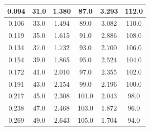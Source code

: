 \documentclass[a4paper,12pt,titlepage]{article}
\begin{document}
\begin{table}[h!]
\begin{tabular}{|cccccc}
\multicolumn{1}{|c|}{0.094}       & \multicolumn{1}{c|}{31.0}               & \multicolumn{1}{c|}{1.380}        & \multicolumn{1}{c|}{87.0}               & \multicolumn{1}{c|}{3.293}       & \multicolumn{1}{c|}{112.0}              \\ \hline
\multicolumn{1}{|c|}{0.106}       & \multicolumn{1}{c|}{33.0}               & \multicolumn{1}{c|}{1.494}       & \multicolumn{1}{c|}{89.0}               & \multicolumn{1}{c|}{3.082}       & \multicolumn{1}{c|}{110.0}              \\ \hline
\multicolumn{1}{|c|}{0.119}       & \multicolumn{1}{c|}{35.0}               & \multicolumn{1}{c|}{1.615}       & \multicolumn{1}{c|}{91.0}               & \multicolumn{1}{c|}{2.886}       & \multicolumn{1}{c|}{108.0}              \\ \hline
\multicolumn{1}{|c|}{0.134}       & \multicolumn{1}{c|}{37.0}               & \multicolumn{1}{c|}{1.732}       & \multicolumn{1}{c|}{93.0}               & \multicolumn{1}{c|}{2.700}         & \multicolumn{1}{c|}{106.0}              \\ \hline
\multicolumn{1}{|c|}{0.154}       & \multicolumn{1}{c|}{39.0}               & \multicolumn{1}{c|}{1.865}       & \multicolumn{1}{c|}{95.0}               & \multicolumn{1}{c|}{2.524}       & \multicolumn{1}{c|}{104.0}              \\ \hline
\multicolumn{1}{|c|}{0.172}       & \multicolumn{1}{c|}{41.0}               & \multicolumn{1}{c|}{2.010}        & \multicolumn{1}{c|}{97.0}               & \multicolumn{1}{c|}{2.355}       & \multicolumn{1}{c|}{102.0}              \\ \hline
\multicolumn{1}{|c|}{0.191}       & \multicolumn{1}{c|}{43.0}               & \multicolumn{1}{c|}{2.154}       & \multicolumn{1}{c|}{99.0}               & \multicolumn{1}{c|}{2.196}       & \multicolumn{1}{c|}{100.0}              \\ \hline
\multicolumn{1}{|c|}{0.217}       & \multicolumn{1}{c|}{45.0}               & \multicolumn{1}{c|}{2.308}       & \multicolumn{1}{c|}{101.0}              & \multicolumn{1}{c|}{2.043}       & \multicolumn{1}{c|}{98.0}               \\ \hline
\multicolumn{1}{|c|}{0.238}       & \multicolumn{1}{c|}{47.0}               & \multicolumn{1}{c|}{2.468}       & \multicolumn{1}{c|}{103.0}              & \multicolumn{1}{c|}{1.872}       & \multicolumn{1}{c|}{96.0}               \\ \hline
\multicolumn{1}{|c|}{0.269}       & \multicolumn{1}{c|}{49.0}               & \multicolumn{1}{c|}{2.643}       & \multicolumn{1}{c|}{105.0}              & \multicolumn{1}{c|}{1.704}       & \multicolumn{1}{c|}{94.0}               \\ \hline

\end{tabular}
\end{table}
\end{document}

